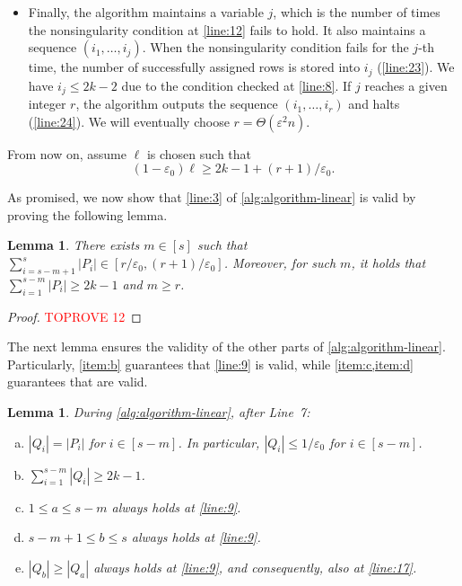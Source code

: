 \documentclass[11pt]{article}
\theoremstyle{plain}
\newtheorem{lemma}[thm]{Lemma}
\theoremstyle{definition}
\theoremstyle{remark}
\newcommand{\eps}{\varepsilon}
\begin{document}
\begin{itemize}
\item Finally, the algorithm maintains a variable $j$, which is the number of times the nonsingularity condition at \cref{line:12} fails to hold.
It also maintains a sequence $(i_1,\dots,i_j)$. 
When the nonsingularity condition fails for the $j$-th time, the number of successfully assigned rows is stored into $i_j$ (\cref{line:23}). We have $i_j\leq 2k-2$ due to the condition checked at \cref{line:8}.
If $j$ reaches a given integer $r$, the algorithm outputs the sequence $(i_1,\dots,i_r)$ and halts (\cref{line:24}).
We will eventually choose $r=\Theta(\eps^2 n)$.
\end{itemize}
From now on, assume $\ell$ is chosen such that
\begin{equation}\label{eq:condition}
(1-\eps_0)\ell\geq 2k-1+(r+1)/\eps_0. 
\end{equation}


As promised, we now show that \cref{line:3} of \cref{alg:algorithm-linear} is valid by proving the following lemma.
\begin{lemma}\label{lem:sum-of-Pi}
There exists $m\in [s]$ such that $\sum_{i=s-m+1}^s |P_i|\in [r/\eps_0, (r+1)/\eps_0]$. Moreover, for such $m$, it holds that $\sum_{i=1}^{s-m}|P_i|\geq 2k-1$ and $m\geq r$. 
\end{lemma}
\begin{proof}\textcolor{red}{TOPROVE 12}\end{proof}

The next lemma ensures the validity of the other parts of \cref{alg:algorithm-linear}. Particularly, \cref{item:b} guarantees that \cref{line:9} is valid, while \cref{item:c,item:d} guarantees that  are valid.

\begin{lemma}\label{lem:basic-claims}
During \cref{alg:algorithm-linear}, after Line~7:
\begin{enumerate}[(a)]
\item\label{item:a}
 $|Q_i|=|P_i|$ for $i\in [s-m]$. In particular, $|Q_i|\leq 1/\eps_0$ for $i\in [s-m]$.
\item\label{item:b}
$\sum_{i=1}^{s-m}|Q_i|\geq 2k-1$.
\item\label{item:c0}
$1\leq a\leq s-m$ always holds at \cref{line:9}.
\item\label{item:c}
$s-m+1\leq b\leq s$ always holds at \cref{line:9}.
\item\label{item:d}
$|Q_{b}|\geq |Q_a|$ always holds at \cref{line:9}, and consequently, also at \cref{line:17}.

\end{enumerate}
\end{lemma}
\end{document}
